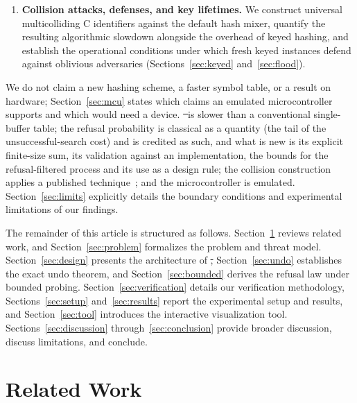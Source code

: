 \begin{enumerate}
\item \textbf{Collision attacks, defenses, and key lifetimes.} We construct universal multicolliding C identifiers against the default hash mixer, quantify the resulting algorithmic slowdown alongside the overhead of keyed hashing, and establish the operational conditions under which fresh keyed instances defend against oblivious adversaries (Sections~\ref{sec:keyed} and~\ref{sec:flood}).
\end{enumerate}

We do not claim a new hashing scheme, a faster symbol table, or a result on hardware; Section~\ref{sec:mcu} states which claims an emulated microcontroller supports and which would need a device. \st\ is slower than a conventional single-buffer table; the refusal probability is classical as a quantity (the tail of the unsuccessful-search cost) and is credited as such, and what is new is its explicit finite-size sum, its validation against an implementation, the bounds for the refusal-filtered process and its use as a design rule; the collision construction applies a published technique~\cite{aumasson2012}; and the microcontroller is emulated. Section~\ref{sec:limits} explicitly details the boundary conditions and experimental limitations of our findings.

The remainder of this article is structured as follows. Section~\ref{sec:related} reviews related work, and Section~\ref{sec:problem} formalizes the problem and threat model. Section~\ref{sec:design} presents the architecture of \st, Section~\ref{sec:undo} establishes the exact undo theorem, and Section~\ref{sec:bounded} derives the refusal law under bounded probing. Section~\ref{sec:verification} details our verification methodology, Sections~\ref{sec:setup} and~\ref{sec:results} report the experimental setup and results, and Section~\ref{sec:tool} introduces the interactive visualization tool. Sections~\ref{sec:discussion} through~\ref{sec:conclusion} provide broader discussion, discuss limitations, and conclude.

\section{Related Work}
\label{sec:related}

